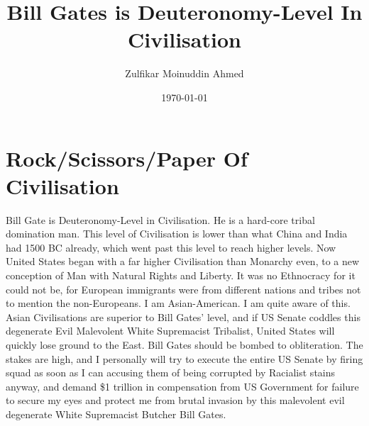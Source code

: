 \documentclass{amsart}
\title{Bill Gates is Deuteronomy-Level In Civilisation}
\author{Zulfikar Moinuddin Ahmed}
\date{\today}
\begin{document}
\maketitle

\section{Rock/Scissors/Paper Of Civilisation}

Bill Gate is Deuteronomy-Level in Civilisation.  He is a hard-core tribal domination man.  This level of Civilisation is lower than what China and India had 1500 BC already, which went past this level to reach higher levels.  Now United States began with a far higher Civilisation than Monarchy even, to a new conception of Man with Natural Rights and Liberty.  It was no Ethnocracy for it could not be, for European immigrants were from different nations and tribes not to mention the non-Europeans.  I am Asian-American.  I am quite aware of this.  Asian Civilisations are superior to Bill Gates' level, and if US Senate coddles this degenerate Evil Malevolent White Supremacist Tribalist, United States will quickly lose ground to the East.  Bill Gates should be bombed to obliteration.  The stakes are high, and I personally will try to execute the entire US Senate by firing squad as soon as I can accusing them of being corrupted by Racialist stains anyway, and demand \$1 trillion in compensation from US Government for failure to secure my eyes and protect me from brutal invasion by this malevolent evil degenerate White Supremacist Butcher Bill Gates.
\end{document}
